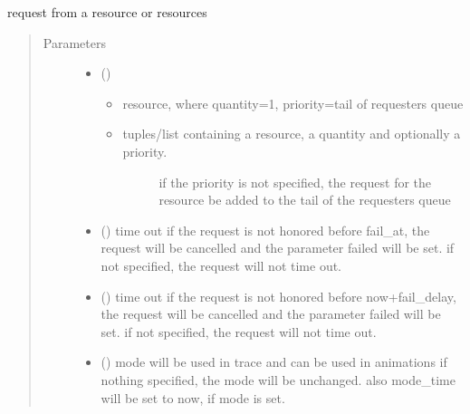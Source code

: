 \documentclass[letterpaper,10pt,english]{sphinxmanual}
\begin{document}
\begin{fulllineitems}
\begin{fulllineitems}
\end{fulllineitems}


\begin{fulllineitems}
\label{\detokenize{Reference:salabim.Component.request}}
request from a resource or resources
\begin{quote}\begin{description}
\item[{Parameters}] \leavevmode\begin{itemize}
\item {} 
 () \textendash{} \begin{itemize}
\item {} 
resource, where quantity=1, priority=tail of requesters queue

\item {} \begin{description}
\item[{tuples/list containing a resource, a quantity and optionally a priority.}] \leavevmode
if the priority is not specified, the request
for the resource be added to the tail of
the requesters queue 

\end{description}

\end{itemize}


\item {} 
 () \textendash{} time out 
if the request is not honored before fail\_at,
the request will be cancelled and the
parameter failed will be set. 
if not specified, the request will not time out.

\item {} 
 () \textendash{} time out 
if the request is not honored before now+fail\_delay,
the request will be cancelled and the
parameter failed will be set. 
if not specified, the request will not time out.

\item {} 
 () \textendash{} mode 
will be used in trace and can be used in animations 
if nothing specified, the mode will be unchanged. 
also mode\_time will be set to now, if mode is set.


\end{itemize}
\end{description}
\end{quote}
\end{fulllineitems}
\end{fulllineitems}
\end{document}
